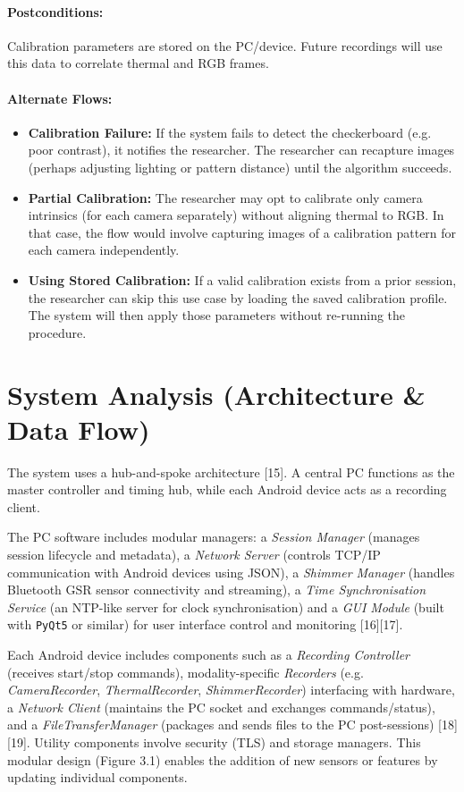 \paragraph{Postconditions:} Calibration parameters are stored on the PC/device. Future recordings will use this data to correlate thermal and RGB frames.
\paragraph{Alternate Flows:}
\begin{itemize}
    \item \textbf{Calibration Failure:} If the system fails to detect the checkerboard (e.g. poor contrast), it notifies the researcher. The researcher can recapture images (perhaps adjusting lighting or pattern distance) until the algorithm succeeds.
    \item \textbf{Partial Calibration:} The researcher may opt to calibrate only camera intrinsics (for each camera separately) without aligning thermal to RGB. In that case, the flow would involve capturing images of a calibration pattern for each camera independently.
    \item \textbf{Using Stored Calibration:} If a valid calibration exists from a prior session, the researcher can skip this use case by loading the saved calibration profile. The system will then apply those parameters without re-running the procedure.
\end{itemize}

\section{System Analysis (Architecture \& Data Flow)}

The system uses a hub-and-spoke architecture [15]. A central PC functions as the master controller and timing hub, while each Android device acts as a recording client.

The PC software includes modular managers: a \textit{Session Manager} (manages session lifecycle and metadata), a \textit{Network Server} (controls TCP/IP communication with Android devices using JSON), a \textit{Shimmer Manager} (handles Bluetooth GSR sensor connectivity and streaming), a \textit{Time Synchronisation Service} (an NTP-like server for clock synchronisation) and a \textit{GUI Module} (built with \texttt{PyQt5} or similar) for user interface control and monitoring [16][17].

Each Android device includes components such as a \textit{Recording Controller} (receives start/stop commands), modality-specific \textit{Recorders} (e.g. \textit{CameraRecorder}, \textit{ThermalRecorder}, \textit{ShimmerRecorder}) interfacing with hardware, a \textit{Network Client} (maintains the PC socket and exchanges commands/status), and a \textit{FileTransferManager} (packages and sends files to the PC post-sessions) [18][19]. Utility components involve security (TLS) and storage managers. This modular design (Figure 3.1) enables the addition of new sensors or features by updating individual components.

